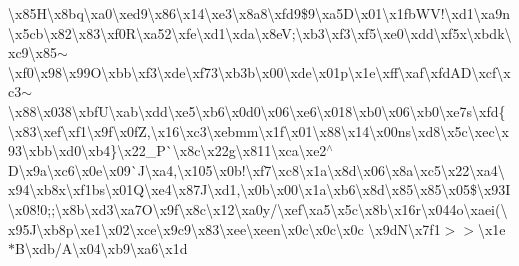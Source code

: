 \begin{DoxyCompactItemize}
\textbackslash{}x85\+H\textbackslash{}x8bq\textbackslash{}xa0\textbackslash{}xed9\textbackslash{}x86\textbackslash{}x14\textbackslash{}xe3\textbackslash{}x8a8\textbackslash{}xfd9\$9\textbackslash{}xa5\+D\textbackslash{}x01\textbackslash{}x1fb\+W\+V!\textbackslash{}xd1\textbackslash{}xa9n\textbackslash{}x5cb\textbackslash{}x82\textbackslash{}x83\textbackslash{}xf0\+R\textbackslash{}xa52\textbackslash{}xfe\textbackslash{}xd1\textbackslash{}xda\textbackslash{}x8e\+V;\textbackslash{}xb3\textbackslash{}xf3\textbackslash{}xf5\textbackslash{}xe0\textbackslash{}xdd\textbackslash{}xf5x\textbackslash{}xbdk\textbackslash{}xc9\textbackslash{}x85$\sim$\textbackslash{}xf0\textbackslash{}x98\textbackslash{}x99\+O\textbackslash{}xbb\textbackslash{}xf3\textbackslash{}xde\textbackslash{}xf73\textbackslash{}xb3b\textbackslash{}x00\textbackslash{}xde\textbackslash{}x01p\textbackslash{}x1e\textbackslash{}xff\textbackslash{}xaf\textbackslash{}xfd\+A\+D\textbackslash{}xcf\textbackslash{}xc3$\sim$\textbackslash{}x88\textbackslash{}x038\textbackslash{}xbf\+U\textbackslash{}xab\textbackslash{}xdd\textbackslash{}xe5\textbackslash{}xb6\textbackslash{}x0d0\textbackslash{}x06\textbackslash{}xe6\textbackslash{}x018\textbackslash{}xb0\textbackslash{}x06\textbackslash{}xb0\textbackslash{}xe7s\textbackslash{}xfd\{\textbackslash{}x83\textbackslash{}xef\textbackslash{}xf1\textbackslash{}x9f\textbackslash{}x0f\+Z,\textbackslash{}x16\textbackslash{}xc3\textbackslash{}xebmm\textbackslash{}x1f\textbackslash{}x01\textbackslash{}x88\textbackslash{}x14\textbackslash{}x00ns\textbackslash{}xd8\textbackslash{}x5c\textbackslash{}xec\textbackslash{}x93\textbackslash{}xbb\textbackslash{}xd0\textbackslash{}xb4\}\textbackslash{}x22\+\_\+\+P\`{}\textbackslash{}x8c\textbackslash{}x22g\textbackslash{}x811\textbackslash{}xca\textbackslash{}xe2$^\wedge$\+D\textbackslash{}x9a\textbackslash{}xc6\textbackslash{}x0e\textbackslash{}x09\`{}\+J\textbackslash{}xa4,\textbackslash{}x105\textbackslash{}x0b!\textbackslash{}xf7\textbackslash{}xc8\textbackslash{}x1a\textbackslash{}x8d\textbackslash{}x06\textbackslash{}x8a\textbackslash{}xc5\textbackslash{}x22\textbackslash{}xa4\textbackslash{}x94\textbackslash{}xb8x\textbackslash{}xf1bs\textbackslash{}x01\+Q\textbackslash{}xe4\textbackslash{}x87\+J\textbackslash{}xd1,\textbackslash{}x0b\textbackslash{}x00\textbackslash{}x1a\textbackslash{}xb6\textbackslash{}x8d\textbackslash{}x85\textbackslash{}x85\textbackslash{}x05\$\textbackslash{}x93\+I\textbackslash{}x08!0;;\textbackslash{}x8b\textbackslash{}xd3\textbackslash{}xa7\+O\textbackslash{}x9f\textbackslash{}x8c\textbackslash{}x12\textbackslash{}xa0y/\textbackslash{}xef\textbackslash{}xa5\textbackslash{}x5c\textbackslash{}x8b\textbackslash{}x16r\textbackslash{}x044o\textbackslash{}xaei(\textbackslash{}x95\+J\textbackslash{}xb8p\textbackslash{}xe1\textbackslash{}x02\textbackslash{}xce\textbackslash{}x9c9\textbackslash{}x83\textbackslash{}xee\textbackslash{}xeen\textbackslash{}x0c\textbackslash{}x0c\textbackslash{}x0c \textbackslash{}x9d\+N\textbackslash{}x7f1$>$$>$\textbackslash{}x1e$\ast$\+B\textbackslash{}xdb/\+A\textbackslash{}x04\textbackslash{}xb9\textbackslash{}xa6\textbackslash{}x1d 
\end{DoxyCompactItemize}

